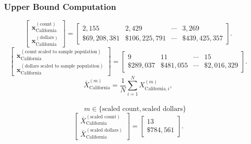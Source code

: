 \subsubsection{Upper Bound Computation}
\[
\begin{bmatrix}
\mathbf{x}_{\text{California}}^{(\text{count})}\\
\mathbf{x}_{\text{California}}^{(\text{dollars})}
\end{bmatrix}
=
\begin{bmatrix}
2{,}155 & 2{,}429 & \cdots & 3{,}269\\
\$69{,}208{,}381 &\$106{,}225{,}791  & \cdots &\$439{,}425{,}357 
\end{bmatrix}.
\]
\[
\begin{bmatrix}
\mathbf{x}_{\text{California}}^{(\text{count scaled to sample population})}\\
\mathbf{x}_{\text{California}}^{(\text{dollars scaled to sample population})}
\end{bmatrix}
=
\begin{bmatrix}
9 & 11 & \cdots & 15\\
\$289{,}037 &\$481{,}055 & \cdots &\$2{,}016{,}329 
\end{bmatrix}.
\]
\[
\bar{X}_{\text{California}}^{(m)}
= \frac{1}{N}\sum_{i=1}^{N} X_{\text{California},i}^{(m)},
\]
\\
\[
\qquad
m \in \{\text{scaled count},\text{scaled dollars}\}
\]
\[
\begin{bmatrix}
\bar{X}_{\text{California}}^{(\text{scaled count})}\\
\bar{X}_{\text{California}}^{(\text{scaled dollars})}
\end{bmatrix}
=
\begin{bmatrix}
13\\
\$784{,}561
\end{bmatrix}.
\]
